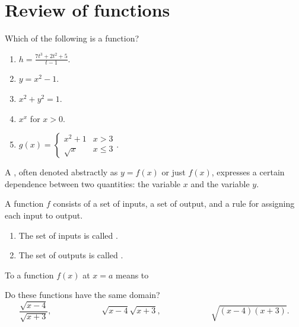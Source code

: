 \documentclass[../main.tex]{subfiles}
\begin{document}
 \section{Review of functions}
\begin{example}
  Which of the following is  a function?
  \begin{enumerate}[label=(\alph*)]
    \item \(h = \frac{7t^{3} + 2t^{2} + 5}{t - 1}\).
    \item \(y = x^{2} - 1\).
    \item \(x^{2} + y^{2} = 1\).
    \item \(x^{x}\) for \(x > 0\).
    \item \(g(x) = \begin{cases} x^{2} + 1 & x > 3\\ \sqrt{x} & x \le 3 \end{cases}\).
  \end{enumerate}
\end{example} 


A , often denoted abstractly as \(y = f(x)\) or just \(f(x)\), expresses a certain dependence between two quantities: the  variable \(x\) and the  variable \(y\).
\vspace{1em}

\begin{mdframed}[style=withref-compact]
  A function \(f\) consists of a set of inputs, a set of output, and a rule for assigning each input to \underline{\hspace{2in}} output.
  \begin{enumerate}
    \item The set of inputs is called \underline{\hspace{1in}}.
    \item The set of outputs is called \underline{\hspace{1in}}.
  \end{enumerate}

\end{mdframed}
To  a function \(f(x)\) at \(x = a\) means to \underline{\hspace{3in}}

\begin{example}
  Do these functions have the same domain?
  \[
    \frac{\sqrt{x - 4}}{\sqrt{x + 3}}, \hspace{1in} \sqrt{x - 4}\sqrt{x+3}, \hspace{1in} \sqrt{(x-4)(x+3)}.
  \]

\end{example}
\end{document}

